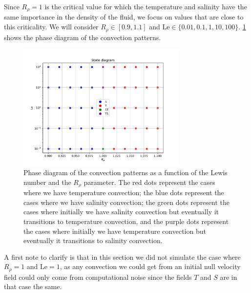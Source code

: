 \documentclass{article}
\def\Le{\mathrm{Le}}
\begin{document}
Since $R_\rho=1$ is the critical value for which the temperature and salinity have the same importance in the density of the fluid, we focus on values that are close to this criticality. We will consider $R_\rho \in [0.9,1.1]$ and $\Le\in \{0.01, 0.1, 1, 10, 100\}$. \cref{fig:phase_diagram} shows the phase diagram of the convection patterns.

\begin{figure}[ht]
  \centering
  \includegraphics[width=0.75\textwidth]{images/phase_diagram.pdf}
  \caption{Phase diagram of the convection patterns as a function of the Lewis number and the $R_{\rho}$ parameter. The red dots represent the cases where we have temperature convection; the blue dots represent the cases where we have salinity convection; the green dots represent the cases where initially we have salinity convection but eventually it transitions to temperature convection, and the purple dots represent the cases where initially we have temperature convection but eventually it transitions to salinity convection.}
  \label{fig:phase_diagram}
\end{figure}

A first note to clarify is that in this section we did not simulate the case where $R_\rho=1$ and $\Le=1$, as any convection we could get from an initial null velocity field could only come from computational noise since the fields $T$ and $S$ are in that case the same. 
\end{document}

